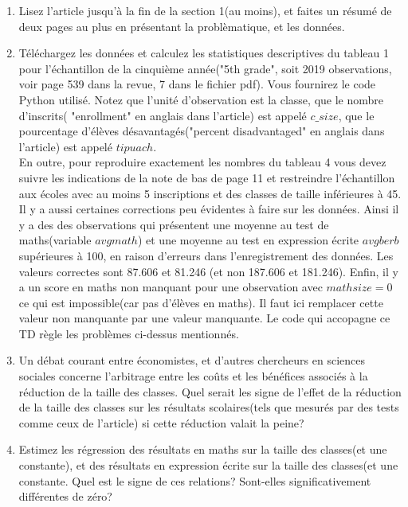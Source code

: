 \begin{enumerate}
\item Lisez l'article jusqu'à la fin de la section 1(au moins), et
  faites un résumé de deux pages au plus en présentant la
  problèmatique, et les données.
\item Téléchargez les données et calculez les statistiques
  descriptives du tableau 1 pour l'échantillon de la cinquième
  année("5th grade", soit 2019 observations, voir page 539 dans la revue, 7
  dans le fichier pdf). Vous fournirez le code Python utilisé. Notez
  que l'unité d'observation est la classe, que le nombre
  d'inscrits( "enrollment" en anglais dans l'article)
  est appelé $c\_size$, que le pourcentage d'élèves
  désavantagés("percent disadvantaged" en anglais dans l'article) est
  appelé $tipuach$.\\
En outre, pour reproduire exactement les nombres du tableau 4 vous
devez suivre les indications de la note de bas de page 11 et
restreindre l'échantillon aux écoles avec au moins 5 inscriptions et
des classes de taille inférieures à 45. Il y a aussi certaines
corrections peu évidentes à faire sur les données. Ainsi il y a des
 des observations qui présentent une moyenne au
test de maths(variable $avgmath$) et une moyenne au test en expression
écrite $avgberb$ supérieures à 100, en raison d'erreurs dans
l'enregistrement des données. Les valeurs correctes sont 87.606 et
81.246 (et non 187.606 et 181.246). Enfin, il y a un score en maths
non manquant pour une observation avec $mathsize = 0$ ce qui est
impossible(car pas d'élèves en maths). Il faut ici remplacer cette
valeur non manquante par une valeur manquante. Le code qui accopagne
ce TD règle les problèmes ci-dessus mentionnés.
\item Un débat courant entre économistes, et d'autres chercheurs en
  sciences sociales concerne l'arbitrage entre les coûts et les
  bénéfices associés à la réduction de la taille des classes. Quel
  serait les signe de l'effet de la réduction de la taille des classes
  sur les résultats scolaires(tels que mesurés par des tests comme
  ceux de l'article) si cette réduction valait la peine?
\item Estimez les régression des résultats en maths sur la taille des
  classes(et une constante), et des résultats en expression écrite sur la taille des
  classes(et une constante. Quel est le signe de ces relations?
  Sont-elles significativement différentes de zéro?
\end{enumerate}






